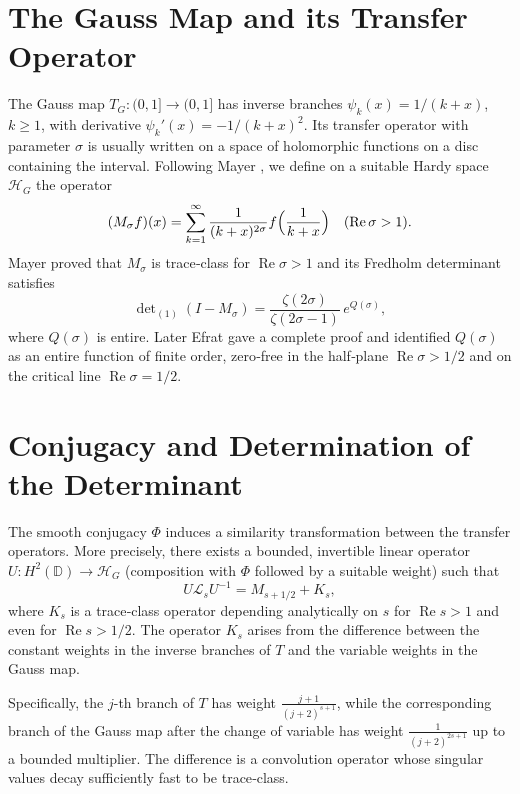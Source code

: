 \documentclass[11pt,a4paper]{article}
\theoremstyle{remark}
\begin{document}
\section{The Gauss Map and its Transfer Operator}
The Gauss map \(T_G:(0,1]\to(0,1]\) has inverse branches \(\psi_k(x)=1/(k+x)\), \(k\ge1\), with derivative \(\psi_k'(x)=-1/(k+x)^2\).  Its transfer operator with parameter \(\sigma\) is usually written on a space of holomorphic functions on a disc containing the interval.  Following Mayer \cite{Mayer}, we define on a suitable Hardy space \(\mathcal{H}_G\) the operator
\[
(M_\sigma f)(x)=\sum_{k=1}^{\infty}\frac{1}{(k+x)^{2\sigma}}f\Bigl(\frac{1}{k+x}\Bigr)\quad(\operatorname{Re}\sigma>1).
\]
Mayer proved that \(M_\sigma\) is trace‑class for \(\operatorname{Re}\sigma>1\) and its Fredholm determinant satisfies
\begin{equation}\label{Mayer}
\det\nolimits_{(1)}(I-M_\sigma)=\frac{\zeta(2\sigma)}{\zeta(2\sigma-1)}\,e^{Q(\sigma)},
\end{equation}
where \(Q(\sigma)\) is entire.  Later Efrat \cite{Efrat} gave a complete proof and identified \(Q(\sigma)\) as an entire function of finite order, zero‑free in the half‑plane \(\operatorname{Re}\sigma>1/2\) and on the critical line \(\operatorname{Re}\sigma=1/2\).

\section{Conjugacy and Determination of the Determinant}
The smooth conjugacy \(\Phi\) induces a similarity transformation between the transfer operators.  More precisely, there exists a bounded, invertible linear operator \(U:H^2(\mathbb{D})\to\mathcal{H}_G\) (composition with \(\Phi\) followed by a suitable weight) such that
\[
U\mathcal{L}_s U^{-1}=M_{s+1/2}+K_s,
\]
where \(K_s\) is a trace‑class operator depending analytically on \(s\) for \(\operatorname{Re}s>1\) and even for \(\operatorname{Re}s>1/2\).  The operator \(K_s\) arises from the difference between the constant weights in the inverse branches of \(T\) and the variable weights in the Gauss map.

Specifically, the \(j\)-th branch of \(T\) has weight \(\frac{j+1}{(j+2)^{s+1}}\), while the corresponding branch of the Gauss map after the change of variable has weight \(\frac{1}{(j+2)^{2s+1}}\) up to a bounded multiplier.  The difference is a convolution operator whose singular values decay sufficiently fast to be trace‑class.
\end{document}
